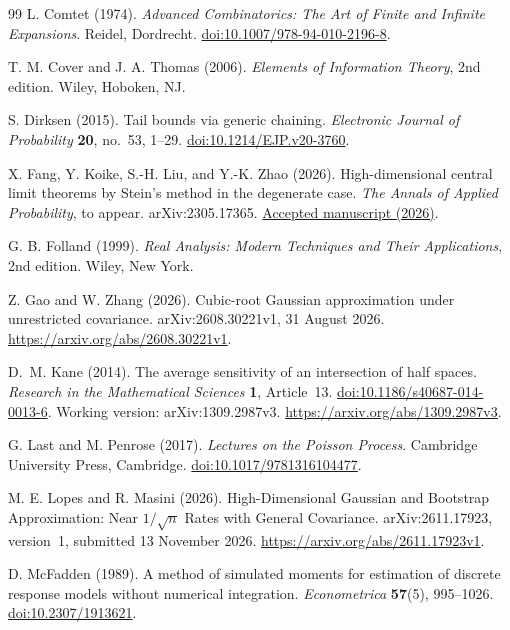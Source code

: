 \documentclass[11pt,letterpaper,twoside,leqno]{article}
\theoremstyle{bookplain}
\theoremstyle{bookremark}
\begin{document}
\begin{thebibliography}{99}
L. Comtet (1974).
\emph{Advanced Combinatorics: The Art of Finite and Infinite Expansions}.
Reidel, Dordrecht.
\href{https://doi.org/10.1007/978-94-010-2196-8}{doi:10.1007/978-94-010-2196-8}.

T. M. Cover and J. A. Thomas (2006).
\emph{Elements of Information Theory}, 2nd edition.
Wiley, Hoboken, NJ.

S. Dirksen (2015).
Tail bounds via generic chaining.
\emph{Electronic Journal of Probability} \textbf{20}, no.~53, 1--29.
\href{https://doi.org/10.1214/EJP.v20-3760}{doi:10.1214/EJP.v20-3760}.

X. Fang, Y. Koike, S.-H. Liu, and Y.-K. Zhao (2026).
High-dimensional central limit theorems by Stein's method in
the degenerate case. \emph{The Annals of Applied Probability}, to appear.
arXiv:2305.17365.
\href{https://research.cuhk.edu.hk/en/publications/high-dimensional-central-limit-theorems-by-steins-method-in-the-d/}{Accepted manuscript (2026)}.

G. B. Folland (1999).
\emph{Real Analysis: Modern Techniques and Their Applications}, 2nd edition.
Wiley, New York.

Z. Gao and W. Zhang (2026).
Cubic-root Gaussian approximation under unrestricted covariance.
arXiv:2608.30221v1, 31 August 2026.
\url{https://arxiv.org/abs/2608.30221v1}.

D.~M. Kane (2014).
The average sensitivity of an intersection of half spaces.
\emph{Research in the Mathematical Sciences} \textbf{1}, Article~13.
\href{https://doi.org/10.1186/s40687-014-0013-6}{doi:10.1186/s40687-014-0013-6}.
Working version: arXiv:1309.2987v3.
\url{https://arxiv.org/abs/1309.2987v3}.

G. Last and M. Penrose (2017).
\emph{Lectures on the Poisson Process}.
Cambridge University Press, Cambridge.
\href{https://doi.org/10.1017/9781316104477}{doi:10.1017/9781316104477}.

M. E. Lopes and R. Masini (2026).
High-Dimensional Gaussian and Bootstrap Approximation:
Near \(1/\sqrt{n}\) Rates with General Covariance.
arXiv:2611.17923, version~1, submitted 13 November 2026.
\url{https://arxiv.org/abs/2611.17923v1}.

D. McFadden (1989).
A method of simulated moments for estimation of discrete
response models without numerical integration.
\emph{Econometrica} \textbf{57}(5), 995--1026.
\href{https://doi.org/10.2307/1913621}{doi:10.2307/1913621}.


\end{thebibliography}
\end{document}
